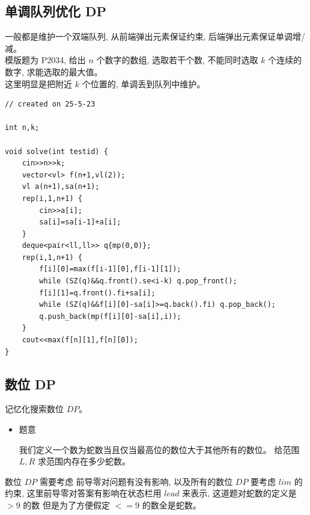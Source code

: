 \documentclass[a4paper,12pt]{article}
\begin{document}
\subsection{单调队列优化 DP}

\noindent 一般都是维护一个双端队列, 从前端弹出元素保证约束, 后端弹出元素保证单调增/减。
\\

\noindent 模版题为 P2034, 给出 \(n\) 个数字的数组, 
选取若干个数, 不能同时选取 \(k\) 个连续的数字, 求能选取的最大值。
\\ 

\noindent 这里明显是把附近 \(k\) 个位置的, 单调丢到队列中维护。

\begin{lstlisting}
// created on 25-5-23

int n,k;

void solve(int testid) {
	cin>>n>>k;
	vector<vl> f(n+1,vl(2));
	vl a(n+1),sa(n+1);
	rep(i,1,n+1) {
		cin>>a[i];
		sa[i]=sa[i-1]+a[i];
	}
	deque<pair<ll,ll>> q{mp(0,0)};
	rep(i,1,n+1) {
		f[i][0]=max(f[i-1][0],f[i-1][1]);
		while (SZ(q)&&q.front().se<i-k) q.pop_front();
		f[i][1]=q.front().fi+sa[i];
		while (SZ(q)&&f[i][0]-sa[i]>=q.back().fi) q.pop_back();
		q.push_back(mp(f[i][0]-sa[i],i));
	}
	cout<<max(f[n][1],f[n][0]);
} 
\end{lstlisting}

\subsection{数位 DP}

\noindent 记忆化搜索数位 \(DP\)。

\begin{itemize}
\item 
题意

我们定义一个数为蛇数当且仅当最高位的数位大于其他所有的数位。
给范围 \(L,R\) 求范围内存在多少蛇数。
\end{itemize}

\noindent 数位 \(DP\) 需要考虑 前导零对问题有没有影响,
以及所有的数位 \(DP\) 要考虑 \(lim\) 的约束, 这里前导零对答案有影响在状态栏用 \(lead\) 来表示,
这道题对蛇数的定义是 \(>9\) 的数 但是为了方便假定 \(<=9\) 的数全是蛇数。
\end{document}
